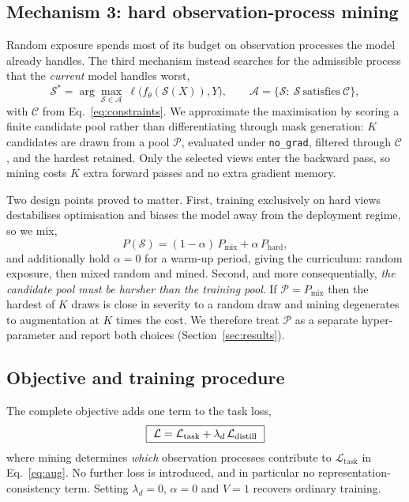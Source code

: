 \documentclass[sigconf,nonacm]{acmart}
\newcommand{\Sobs}{\mathcal{S}}
\begin{document}
\subsection{Mechanism 3: hard observation-process mining}
\label{sec:mining}
Random exposure spends most of its budget on observation processes the model already handles. The third
mechanism instead searches for the admissible process that the \emph{current} model handles worst,
\begin{equation}
\Sobs^{*}=\arg\max_{\Sobs\in\mathcal{A}}\ \ell\big(f_\theta(\Sobs(X)),Y\big),
\qquad \mathcal{A}=\{\Sobs:\ \Sobs\ \mathrm{satisfies}\ \mathcal{C}\},
\label{eq:mining}
\end{equation}
with $\mathcal{C}$ from Eq.~\ref{eq:constraints}. We approximate the maximisation by scoring a finite candidate
pool rather than differentiating through mask generation: $K$ candidates are drawn from a pool $\mathcal{P}$,
evaluated under \texttt{no\_grad}, filtered through $\mathcal{C}$, and the hardest retained. Only the selected
views enter the backward pass, so mining costs $K$ extra forward passes and no extra gradient memory.

Two design points proved to matter. First, training exclusively on hard views destabilises optimisation and
biases the model away from the deployment regime, so we mix,
\begin{equation}
P(\Sobs)=(1-\alpha)\,P_{\mathrm{mix}}+\alpha\,P_{\mathrm{hard}},
\label{eq:alpha}
\end{equation}
and additionally hold $\alpha=0$ for a warm-up period, giving the curriculum: random exposure, then mixed random
and mined. Second, and more consequentially, \emph{the candidate pool must be harsher than the training pool}.
If $\mathcal{P}=P_{\mathrm{mix}}$ then the hardest of $K$ draws is close in severity to a random draw and mining
degenerates to augmentation at $K$ times the cost. We therefore treat $\mathcal{P}$ as a separate
hyper-parameter and report both choices (Section~\ref{sec:results}).

\subsection{Objective and training procedure}
The complete objective adds one term to the task loss,
\begin{equation}
\fbox{$\displaystyle\ \mathcal{L}=\mathcal{L}_{\mathrm{task}}+\lambda_{d}\,\mathcal{L}_{\mathrm{distill}}\ $}
\label{eq:objective}
\end{equation}
where mining determines \emph{which} observation processes contribute to $\mathcal{L}_{\mathrm{task}}$ in
Eq.~\ref{eq:aug}. No further loss is introduced, and in particular no representation-consistency term. Setting
$\lambda_d=0$, $\alpha=0$ and $V=1$ recovers ordinary training.
\end{document}
